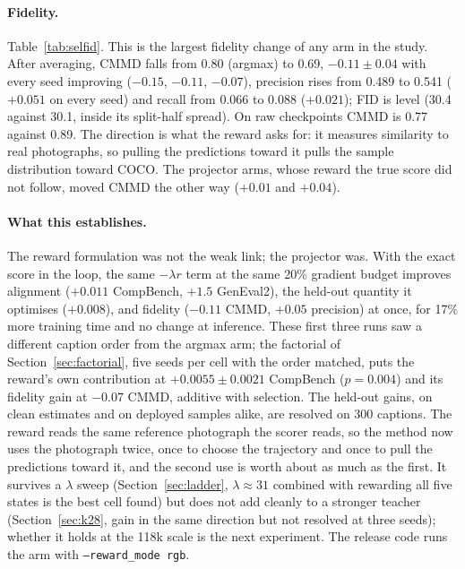\documentclass[11pt,a4paper]{article}
\begin{document}
\paragraph{Fidelity.}
Table~\ref{tab:selfid}. This is the largest fidelity change of any arm in the study. After averaging, CMMD falls from 0.80 (argmax) to 0.69, $-0.11\pm0.04$ with every seed improving ($-0.15$, $-0.11$, $-0.07$), precision rises from 0.489 to 0.541 ($+0.051$ on every seed) and recall from 0.066 to 0.088 ($+0.021$); FID is level (30.4 against 30.1, inside its split-half spread). On raw checkpoints CMMD is 0.77 against 0.89. The direction is what the reward asks for: it measures similarity to real photographs, so pulling the predictions toward it pulls the sample distribution toward COCO. The projector arms, whose reward the true score did not follow, moved CMMD the other way ($+0.01$ and $+0.04$).

\paragraph{What this establishes.}
The reward formulation was not the weak link; the projector was. With the exact score in the loop, the same $-\lambda r$ term at the same 20\% gradient budget improves alignment ($+0.011$ CompBench, $+1.5$ GenEval2), the held-out quantity it optimises ($+0.008$), and fidelity ($-0.11$ CMMD, $+0.05$ precision) at once, for 17\% more training time and no change at inference. These first three runs saw a different caption order from the argmax arm; the factorial of Section~\ref{sec:factorial}, five seeds per cell with the order matched, puts the reward's own contribution at $+0.0055\pm0.0021$ CompBench ($p=0.004$) and its fidelity gain at $-0.07$ CMMD, additive with selection. The held-out gains, on clean estimates and on deployed samples alike, are resolved on 300 captions. The reward reads the same reference photograph the scorer reads, so the method now uses the photograph twice, once to choose the trajectory and once to pull the predictions toward it, and the second use is worth about as much as the first. It survives a $\lambda$ sweep (Section~\ref{sec:ladder}, $\lambda\approx31$ combined with rewarding all five states is the best cell found) but does not add cleanly to a stronger teacher (Section~\ref{sec:k28}, gain in the same direction but not resolved at three seeds); whether it holds at the 118k scale is the next experiment. The release code runs the arm with \texttt{--reward\_mode rgb}.
\end{document}
